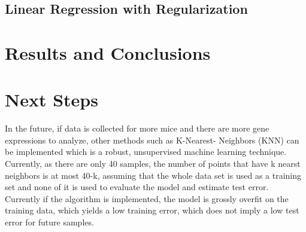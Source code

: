 \documentclass[letterpaper]{article}
\begin{document}
\subsection{Linear Regression with Regularization}

\section{Results and Conclusions}

\section{Next Steps}
In the future, if data is collected for more mice and there are more gene expressions to analyze, other methods such as K-Nearest-
Neighbors (KNN) can be implemented which is a robust, unsupervised machine learning technique.  Currently, as there are only 40 
samples, the number of points that have k nearst neighbors is at most 40-k, assuming that the whole data set is used as a training 
set and none of it is used to evaluate the model and estimate test error.  Currently if the algorithm is implemented, the 
model is grossly overfit on the training data, which yields a low training error, which does not imply a low test error for future samples.
\end{document}
